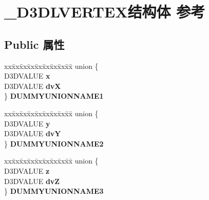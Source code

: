 \hypertarget{struct___d3_d_l_v_e_r_t_e_x}{}\section{\+\_\+\+D3\+D\+L\+V\+E\+R\+T\+E\+X结构体 参考}
\label{struct___d3_d_l_v_e_r_t_e_x}
\subsection*{Public 属性}
\begin{DoxyCompactItemize}
\item 
\mbox{\label{struct___d3_d_l_v_e_r_t_e_x_aecbc4dc758c25a5f106397ce62aa3485}} 
\begin{tabbing}
xx\=xx\=xx\=xx\=xx\=xx\=xx\=xx\=xx\=\kill
union \{\\
\>D3DVALUE {\bfseries x}\\
\>D3DVALUE {\bfseries dvX}\\
\} {\bfseries DUMMYUNIONNAME1}\\

\end{tabbing}\item 
\mbox{\label{struct___d3_d_l_v_e_r_t_e_x_a6648b62589a2d63da9a12a73c693baeb}} 
\begin{tabbing}
xx\=xx\=xx\=xx\=xx\=xx\=xx\=xx\=xx\=\kill
union \{\\
\>D3DVALUE {\bfseries y}\\
\>D3DVALUE {\bfseries dvY}\\
\} {\bfseries DUMMYUNIONNAME2}\\

\end{tabbing}\item 
\mbox{\label{struct___d3_d_l_v_e_r_t_e_x_aa7ffc7202469e02f06a9eba0db0fe034}} 
\begin{tabbing}
xx\=xx\=xx\=xx\=xx\=xx\=xx\=xx\=xx\=\kill
union \{\\
\>D3DVALUE {\bfseries z}\\
\>D3DVALUE {\bfseries dvZ}\\
\} {\bfseries DUMMYUNIONNAME3}\\


\end{tabbing}
\end{DoxyCompactItemize}
